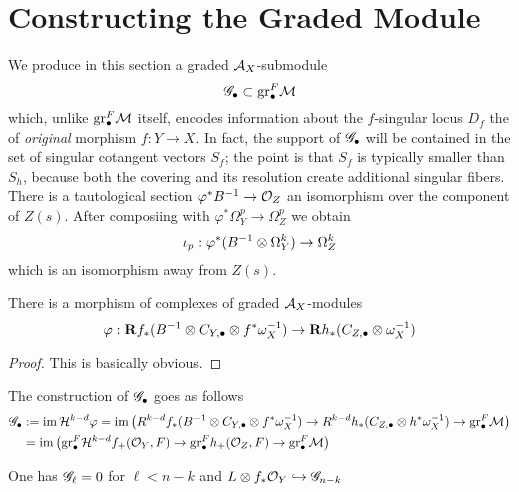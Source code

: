 \documentclass[12pt]{article}
\renewcommand{\gr}{\mathrm{gr}}
\begin{document}
\section{Constructing the Graded Module}

\newcommand{\Rbf}{\mathbf{R}}

We produce in this section a graded $\mathcal{A}_X$-submodule
\[ \G_\bullet \subset \gr^F_\bullet \cM \]
which, unlike $\gr_\bullet^F \cM$ itself, encodes information about the $f$-singular locus $D_f$ the of \textit{original} morphism $f : Y \to X$. In fact, the support of $\mathscr{G}_\bullet$ will be contained in the set of singular cotangent vectors $S_f$; the point is that $S_f$ is typically smaller than $S_h$, because both the covering and its resolution create additional singular fibers. 
\bigskip\\
There is a tautological section $\varphi^* B^{-1} \to \mathcal{O}_{Z}$ an isomorphism over the component of $Z(s)$. After composiing with $\varphi^* \Omega_Y^p \to \Omega_Z^p$ we obtain
\[ \iota_p : \varphi^* (B^{-1} \otimes \Omega_Y^k) \to \Omega_Z^k \]
which is an isomorphism away from $Z(s)$. 

\begin{prop}
There is a morphism of complexes of graded $\mathcal{A}_X$-modules
\[ \varphi : \Rbf f_*  (B^{-1} \ot C_{Y,\bullet} \ot f^* \omega_X^{-1}) \to \Rbf h_* (C_{Z,\bullet} \ot \omega_X^{-1}) \]
\end{prop}

\begin{proof}
This is basically obvious.
\end{proof}

The construction of $\mathscr{G}_\bullet$ goes as follows
\begin{align*}
\G_\bullet & := \im{\cH^{k-d} \varphi} = \im{\left( R^{k-d} f_*  (B^{-1} \ot C_{Y,\bullet} \ot f^* \omega_X^{-1}) \to R^{k-d} h_* (C_{Z,\bullet} \ot h^* \omega_X^{-1}) \to \gr_\bullet^F \cM \right)}
\\
& = \im{\left( \gr_\bullet^F \cH^{k-d} f_+ (\struct{Y}, F) \to \gr_\bullet^F h_+(\struct{Z}, F) \to \gr_\bullet^F \cM \right)}
\end{align*}

\begin{prop}
One has $\mathscr{G}_\ell = 0$ for $\ell < n - k$ and $L \otimes f_* \mathcal{O}_{Y}\hookrightarrow \mathscr{G}_{n-k}$
\end{prop} 
\end{document}
